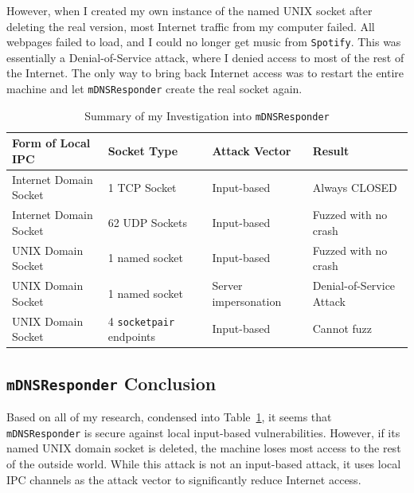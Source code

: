 However, when I created my own instance of the named UNIX socket after deleting the real version, most Internet traffic from my computer failed.  All webpages failed to load, and I could no longer get music from \texttt{Spotify}.  This was essentially a Denial-of-Service attack, where I denied access to most of the rest of the Internet.  The only way to bring back Internet access was to restart the entire machine and let \texttt{mDNSResponder} create the real socket again.

\begin{table}
\centering
\begin{scriptsize}
\begin{tabular}{ l | l | l | l }
\textbf{Form of Local IPC} & \textbf{Socket Type} & \textbf{Attack Vector} & \textbf{Result} \\ \hline
Internet Domain Socket & 1 TCP Socket & Input-based & Always CLOSED \\ \hline
Internet Domain Socket & 62 UDP Sockets & Input-based & Fuzzed with no crash \\ \hline
UNIX Domain Socket & 1 named socket & Input-based & Fuzzed with no crash \\ \hline
UNIX Domain Socket & 1 named socket & Server impersonation & Denial-of-Service Attack \\ \hline
UNIX Domain Socket & 4 \texttt{socketpair} endpoints & Input-based & Cannot fuzz \\ \hline
\end{tabular}
\caption{Summary of my Investigation into \texttt{mDNSResponder}}
\label{tab:mdnsData}
\end{scriptsize}
\end{table} 

\subsection{\texttt{mDNSResponder} Conclusion}
\label{sec:mdnsConclusion}
Based on all of my research, condensed into Table~\ref{tab:mdnsData}, it seems that \texttt{mDNSResponder} is secure against local input-based vulnerabilities.  However, if its named UNIX domain socket is deleted, the machine loses most access to the rest of the outside world.  While this attack is not an input-based attack, it uses local IPC channels as the attack vector to significantly reduce Internet access.
